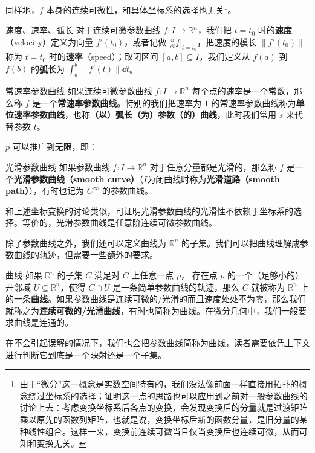 同样地，$f$ 本身的连续可微性，和具体坐标系的选择也无关\footnote{由于“微分”这一概念是实数空间特有的，我们没法像前面一样直接用拓扑的概念绕过坐标系的选择；证明这一点的思路也可以应用到之前对一般参数曲线的讨论上去：考虑变换坐标系后各点的变换，会发现变换后的分量就是过渡矩阵乘以原先的函数列矩阵，也就是说，变换坐标后新的函数分量，是旧分量的某种线性组合。这样一来，变换前连续可微当且仅当变换后也连续可微，从而可知和变换无关。}。

\begin{definition}{速度、速率、弧长}
对于连续可微参数曲线 $f: I \to \mathbb{R}^n$，我们把 $t = t_0$ 时的\textbf{速度}（velocity）定义为向量 $f'(t_0)$，或者记做 $\frac{\dd}{\dd t} f |_{t = t_0}$，把速度的模长 $\|f'(t_0)\|$ 称为 $t = t_0$ 时的\textbf{速率}（speed）；取闭区间 $[a, b] \subseteq I$，我们定义从 $f(a)$ 到 $f(b)$ 的\textbf{弧长}为 $\int_a^b \|f'(t)\| \dd t$。
\end{definition}

\begin{definition}{常速率参数曲线}\label{def_eucur_1}
如果连续可微参数曲线 $f: I \to \mathbb{R}^n$ 每个点的速率是一个常数，那么称 $f$ 是一个\textbf{常速率参数曲线}。特别的我们把速率为 $1$ 的常速率参数曲线称为\textbf{单位速率参数曲线}，也称\textbf{（以）弧长（为）参数（的）曲线}，此时我们常用 $s$ 来代替参数 $t$。
\end{definition}

$p$ 可以推广到无限，即：

\begin{definition}{光滑参数曲线}
如果参数曲线 $f: I \to \mathbb{R}^n$ 对于任意分量都是光滑的，那么称 $f$ 是一个\textbf{光滑参数曲线（smooth curve）}（$I$为闭曲线时称为\textbf{光滑道路（smooth path）}），有时也记为 $C^\infty$ 的参数曲线。
\end{definition}

和上述坐标变换的讨论类似，可证明光滑参数曲线的光滑性不依赖于坐标系的选择。等价的，光滑参数曲线是任意阶连续可微参数曲线。

除了参数曲线之外，我们还可以定义曲线为 $\mathbb{R}^n$ 的子集。我们可以把曲线理解成参数曲线的轨迹，但需要一些额外的要求。

\begin{definition}{曲线}
如果 $\mathbb{R}^n$ 的子集 $C$ 满足对 $C$ 上任意一点 $p$， 存在点 $p$ 的一个（足够小的）开邻域 $U \subseteq \mathbb{R}^n$，使得 $C \cap U$ 是一条简单参数曲线的轨迹，那么 $C$ 就被称为 $\mathbb{R}^n$ 上的一条\textbf{曲线}。如果参数曲线是连续可微的/光滑的而且速度处处不为零，那么我们就称之为\textbf{连续可微的/光滑曲线}，有时也简称为曲线。在微分几何中，我们一般要求曲线是连通的。
\end{definition}

在不会引起误解的情况下，我们也会把参数曲线简称为曲线，读者需要依凭上下文进行判断它到底是一个映射还是一个子集。

